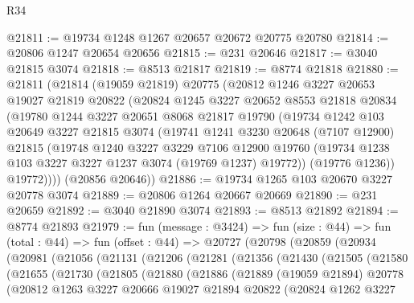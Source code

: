 \begin{lexlean}{R34}
\begin{coremodule}
@21811 := @19734 @1248 @1267 @20657 @20672 @20775 @20780
@21814 := @20806 @1247 @20654 @20656
@21815 := @231 @20646
@21817 := @3040 @21815 @3074
@21818 := @8513 @21817
@21819 := @8774 @21818
@21880 := @21811
    (@21814
      (@19059 @21819)
      @20775
      (@20812
        @1246
        @3227
        @20653
        @19027
        @21819
        @20822
        (@20824
          @1245
          @3227
          @20652
          @8553
          @21818
          @20834
          (@19780
            @1244
            @3227
            @20651
            @8068
            @21817
            @19790
            (@19734
              @1242
              @103
              @20649
              @3227
              @21815
              @3074
              (@19741
                @1241
                @3230
                @20648
                (@7107 @12900)
                @21815
                (@19748
                  @1240
                  @3227
                  @3229
                  @7106
                  @12900
                  @19760
                  (@19734 @1238 @103 @3227 @3227 @1237 @3074 (@19769 @1237) @19772))
                (@19776 @1236))
              @19772))))
      (@20856 @20646))
@21886 := @19734 @1265 @103 @20670 @3227 @20778 @3074
@21889 := @20806 @1264 @20667 @20669
@21890 := @231 @20659
@21892 := @3040 @21890 @3074
@21893 := @8513 @21892
@21894 := @8774 @21893
@21979 := fun (message : @3424) =>
  fun (size : @44) =>
  fun (total : @44) =>
  fun (offset : @44) =>
  @20727
    (@20798
      (@20859
        (@20934
          (@20981
            (@21056
              (@21131
                (@21206
                  (@21281
                    (@21356
                      (@21430
                        (@21505
                          (@21580
                            (@21655
                              (@21730
                                (@21805
                                  (@21880
                                    (@21886
                                      (@21889
                                        (@19059 @21894)
                                        @20778
                                        (@20812
                                          @1263
                                          @3227
                                          @20666
                                          @19027
                                          @21894
                                          @20822
                                          (@20824
                                            @1262
                                            @3227

\end{coremodule}
\end{lexlean}

